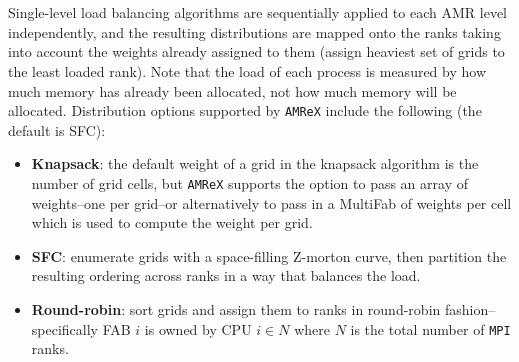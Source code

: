 \documentclass{homework}
\begin{document}
\\ \\ \noindent
Single-level load balancing algorithms are sequentially applied to each AMR level independently, and the resulting distributions are mapped onto the ranks taking into account the weights already assigned to them (assign heaviest set of grids to the least loaded rank). Note that the load of each process is measured by how much memory has already been allocated, not how much memory will be allocated. Distribution options supported by \texttt{AMReX} include the following (the default is SFC):
\begin{itemize}
    \item \textbf{Knapsack}: the default weight of a grid in the knapsack algorithm is the number of grid cells, but \texttt{AMReX} supports the option to pass an array of weights--one per grid--or alternatively to pass in a MultiFab of weights per cell which is used to compute the weight per grid.
    \item \textbf{SFC}: enumerate grids with a space-filling Z-morton curve, then partition the resulting ordering across ranks in a way that balances the load.
    \item \textbf{Round-robin}: sort grids and assign them to ranks in round-robin fashion--specifically FAB $i$ is owned by CPU $i \in N$ where $N$ is the total number of \texttt{MPI} ranks.
\end{itemize}




\end{document}
